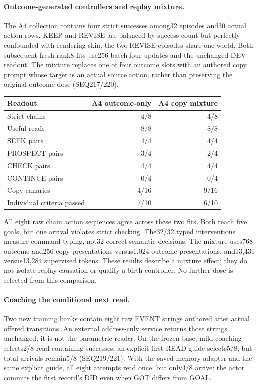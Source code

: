 \documentclass{article}
\begin{document}
\paragraph{Outcome-generated controllers and replay mixture.}
The A4 collection contains four strict successes among32 episodes and30 actual
action rows. KEEP and REVISE are balanced by success count but perfectly
confounded with rendering skin; the two REVISE episodes share one world.
Both subsequent fresh rank8 fits use256 batch-four updates and the unchanged
DEV readout. The mixture replaces one of four outcome slots with an authored
copy prompt whose target is an actual source action, rather than preserving
the original outcome dose (SEQ217/220).
\begin{center}
\begin{tabular}{lrr}
\toprule
Readout & A4 outcome-only & A4 copy mixture \\
\midrule
Strict chains &4/8&4/8\\
Useful reads &8/8&8/8\\
SEEK pairs &4/4&4/4\\
PROSPECT pairs &3/4&2/4\\
CHECK pairs &4/4&4/4\\
CONTINUE pairs &0/4&0/4\\
Copy canaries &4/16&9/16\\
Individual criteria passed &7/10&6/10\\
\bottomrule
\end{tabular}
\end{center}
All eight raw chain action sequences agree across these two fits. Both reach
five goals, but one arrival violates strict checking. The32/32 typed
interventions measure command typing, not32 correct semantic decisions.
The mixture uses768 outcome and256 copy presentations versus1,024 outcome
presentations, and13,431 versus13,284 supervised tokens. These results describe
a mixture effect; they do not isolate replay causation or qualify a birth
controller. No further dose is selected from this comparison.

\paragraph{Coaching the conditional next read.}
Two new training banks contain eight raw EVENT strings authored after actual
offered transitions. An external address-only service returns those strings
unchanged; it is not the parametric reader. On the frozen base, mild coaching
selects2/8 read-containing successes; an explicit first-READ guide selects5/8,
but total arrivals remain5/8 (SEQ219/221). With the saved memory adapter and
the same explicit guide, all eight attempts read once, but only4/8 arrive:
the actor commits the first record's DID even when GOT differs from GOAL.
\end{document}
